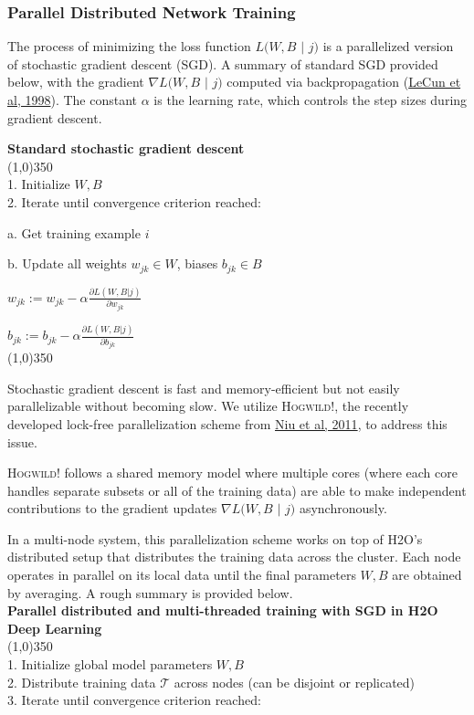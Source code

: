 \newpage
\subsubsection{Parallel Distributed Network Training} 

The process of minimizing the loss function $L(W,B$ $|$ $j)$ is a parallelized version of stochastic gradient descent (SGD). A summary of standard SGD provided below, with the gradient $\nabla L(W,B$ $|$ $j)$ computed via backpropagation (\href{http://yann.lecun.com/exdb/publis/pdf/lecun-98b.pdf}{LeCun et al, 1998}). The constant $\alpha$ is the learning rate, which controls the step sizes during gradient descent.


{\bf{\footnotesize{Standard stochastic gradient descent}}}
\\
\line(1,0){350}
\\
1. Initialize $W,B$ 
\\
2. Iterate until convergence criterion reached:

\hspace{1cm} a. Get training example $i$

\hspace{1cm} b. Update all weights $w_{jk} \in W$, biases $b_{jk} \in B$

\hspace{2cm}  $w_{jk} := w_{jk} - \alpha \frac{\partial L(W,B | j)}{\partial w_{jk}}$

\hspace{2cm} $b_{jk} := b_{jk} - \alpha \frac{\partial L(W,B | j)}{\partial b_{jk}}$
\\
\line(1,0){350}

Stochastic gradient descent is fast and memory-efficient but not easily parallelizable without becoming slow. We utilize \textsc{Hogwild!}, the recently developed lock-free parallelization scheme from \href{http://i.stanford.edu/hazy/papers/hogwild-nips.pdf}{Niu et al, 2011}, to address this issue. 

\textsc{Hogwild!} follows a shared memory model where multiple cores (where each core handles separate subsets or all of the training data) are able to make independent contributions to the gradient updates $\nabla L(W,B$ $ |$ $j)$ asynchronously. 

In a multi-node system, this parallelization scheme works on top of H2O's distributed setup that distributes the training data across the cluster. Each node operates in parallel on its local data until the final parameters $W,B$ are obtained by averaging. A rough summary is provided below. 
\\
\noindent
{\bf{\footnotesize{Parallel distributed and multi-threaded training with SGD in H2O Deep Learning}}}
\\
\line(1,0){350}
\\
1. Initialize global model parameters $W,B$
\\
2. Distribute training data $\mathcal{T}$ across nodes (can be disjoint or replicated)
\\
3. Iterate until convergence criterion reached:


